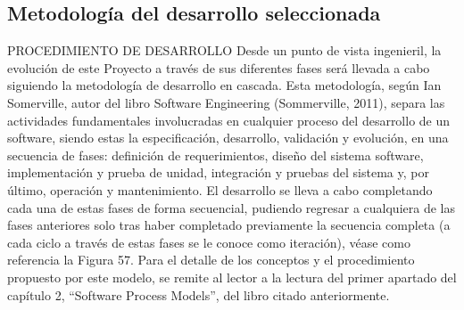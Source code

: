 
\subsection*{Metodología del desarrollo seleccionada}

PROCEDIMIENTO DE DESARROLLO
Desde un punto de vista ingenieril, la evolución de este Proyecto a través de sus diferentes fases será llevada a cabo siguiendo la metodología de desarrollo en cascada.
Esta metodología, según Ian Somerville, autor del libro Software Engineering (Sommerville, 2011), separa las actividades fundamentales involucradas en cualquier proceso del desarrollo de un software, siendo estas la especificación, desarrollo, validación y evolución, en una secuencia de fases: definición de requerimientos, diseño del sistema software, implementación y prueba de unidad, integración y pruebas del sistema y, por último, operación y mantenimiento. El desarrollo se lleva a cabo completando cada una de estas fases de forma secuencial, pudiendo regresar a cualquiera de las fases anteriores solo tras haber completado previamente la secuencia completa (a cada ciclo a través de estas fases se le conoce como iteración), véase como referencia la Figura 57.
Para el detalle de los conceptos y el procedimiento propuesto por este modelo, se remite al lector a la lectura del primer apartado del capítulo 2, “Software Process Models”, del libro citado anteriormente.
 
